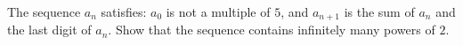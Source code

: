 The sequence $a_n$ satisfies: $a_0$ is not a multiple of $5$, and $a_{n+1}$ is the sum of $a_n$ and the last digit of $a_n$. Show that the sequence contains infinitely many powers of $2$.
